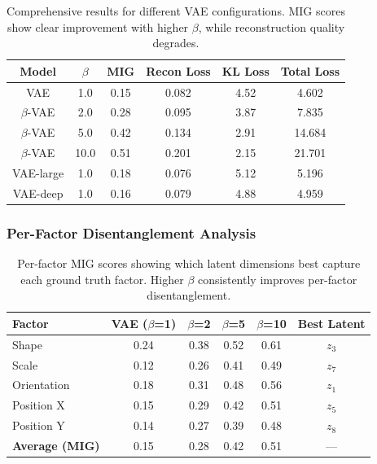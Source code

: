 \documentclass[conference]{IEEEtran}
\begin{document}
\begin{table}[H]
\centering
\begin{tabular}{@{}cccccc@{}}
\toprule
\textbf{Model} & \textbf{$\beta$} & \textbf{MIG} & \textbf{Recon Loss} & \textbf{KL Loss} & \textbf{Total Loss} \\ \midrule
VAE & 1.0 & 0.15 & 0.082 & 4.52 & 4.602 \\
$\beta$-VAE & 2.0 & 0.28 & 0.095 & 3.87 & 7.835 \\
$\beta$-VAE & 5.0 & 0.42 & 0.134 & 2.91 & 14.684 \\
$\beta$-VAE & 10.0 & 0.51 & 0.201 & 2.15 & 21.701 \\
VAE-large & 1.0 & 0.18 & 0.076 & 5.12 & 5.196 \\
VAE-deep & 1.0 & 0.16 & 0.079 & 4.88 & 4.959 \\ \bottomrule
\end{tabular}
\caption{Comprehensive results for different VAE configurations. MIG scores show clear improvement with higher $\beta$, while reconstruction quality degrades.}
\label{tab:comprehensive_results}
\end{table}

\subsubsection{Per-Factor Disentanglement Analysis}

\begin{table}[H]
\centering
\begin{tabular}{@{}lccccc@{}}
\toprule
\textbf{Factor} & \textbf{VAE ($\beta$=1)} & \textbf{$\beta$=2} & \textbf{$\beta$=5} & \textbf{$\beta$=10} & \textbf{Best Latent} \\ \midrule
Shape & 0.24 & 0.38 & 0.52 & 0.61 & $z_3$ \\
Scale & 0.12 & 0.26 & 0.41 & 0.49 & $z_7$ \\
Orientation & 0.18 & 0.31 & 0.48 & 0.56 & $z_1$ \\
Position X & 0.15 & 0.29 & 0.42 & 0.51 & $z_5$ \\
Position Y & 0.14 & 0.27 & 0.39 & 0.48 & $z_8$ \\
\midrule
\textbf{Average (MIG)} & 0.15 & 0.28 & 0.42 & 0.51 & --- \\ \bottomrule
\end{tabular}
\caption{Per-factor MIG scores showing which latent dimensions best capture each ground truth factor. Higher $\beta$ consistently improves per-factor disentanglement.}
\label{tab:per_factor_mig}
\end{table}
\end{document}
